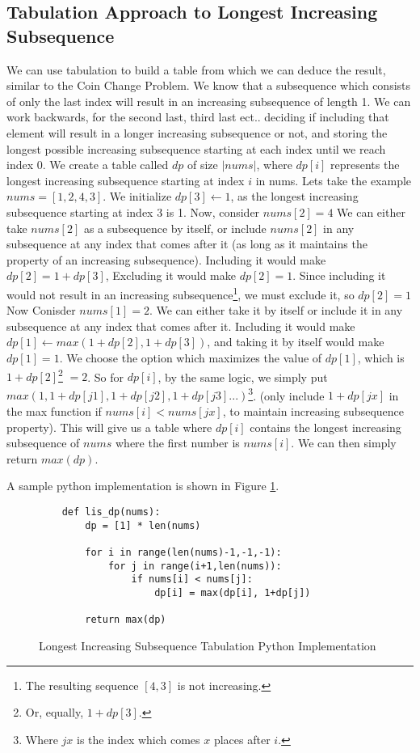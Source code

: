 \subsection{Tabulation Approach to Longest Increasing Subsequence}
We can use tabulation to build a table from which we can deduce the result, similar to the Coin Change Problem.
We know that a subsequence which consists of only the last index will result in an increasing subsequence of length 1.
We can work backwards, for the second last, third last ect.. deciding if including that element will result in a longer increasing subsequence or not,
and storing the longest possible increasing subsequence starting at each index until we reach index 0.
We create a table called $dp$ of size $|nums|$, where $dp[i]$ represents the longest increasing subsequence starting at index $i$ in nums.
Lets take the example $nums = [1,2,4,3]$.
We initialize $dp[3] \leftarrow 1$, as the longest increasing subsequence starting at index 3 is 1.
Now, consider $nums[2] = 4$
We can either take $nums[2]$ as a subsequence by itself, or include $nums[2]$ in any subsequence at any index that comes after it (as long as it maintains the property of an increasing subsequence).
Including it would make $dp[2] = 1+dp[3]$,
Excluding it would make $dp[2] = 1$.
Since including it would not result in an increasing subsequence\footnote{The resulting sequence $[4,3]$ is not increasing.}, we must exclude it, so $dp[2] = 1$
Now Conisder $nums[1] = 2$.
We can either take it by itself or include it in any subsequence at any index that comes after it.
Including it would make $dp[1] \leftarrow max(1+dp[2], 1+dp[3])$, and taking it by itself would make $dp[1] = 1$.
We choose the option which maximizes the value of $dp[1]$, which is $1+dp[2]$\footnote{Or, equally, $1+dp[3]$.} $= 2$.
So for $dp[i]$, by the same logic, we simply put $max(1,1+dp[j1],1+dp[j2],1+dp[j3]...)$\footnote{Where $jx$ is the index which comes $x$ places after $i$.}.
(only include $1+dp[jx]$ in the max function if $nums[i] < nums[jx]$, to maintain increasing subsequence property).
This will give us a table where $dp[i]$ contains the longest increasing subsequence of $nums$ where the first number is $nums[i]$.
We can then simply return $max(dp)$.

A sample python implementation is shown in Figure \ref{fig:lis-dp}.

\begin{figure}[H]
    \centering
    \begin{lstlisting}
    def lis_dp(nums):
        dp = [1] * len(nums)
    
        for i in range(len(nums)-1,-1,-1):
            for j in range(i+1,len(nums)):
                if nums[i] < nums[j]:
                    dp[i] = max(dp[i], 1+dp[j])
    
        return max(dp)
    \end{lstlisting}
    \caption{Longest Increasing Subsequence Tabulation Python Implementation}
    \label{fig:lis-dp}
\end{figure}


